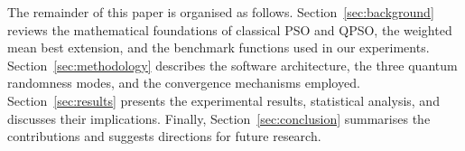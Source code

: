 The remainder of this paper is organised as follows.
Section~\ref{sec:background} reviews the mathematical foundations of classical
PSO and QPSO, the weighted mean best extension, and the benchmark functions
used in our experiments.  Section~\ref{sec:methodology} describes the software
architecture, the three quantum randomness modes, and the convergence
mechanisms employed.  Section~\ref{sec:results} presents the experimental
results, statistical analysis, and discusses their implications.  Finally,
Section~\ref{sec:conclusion} summarises the contributions and suggests
directions for future research.
